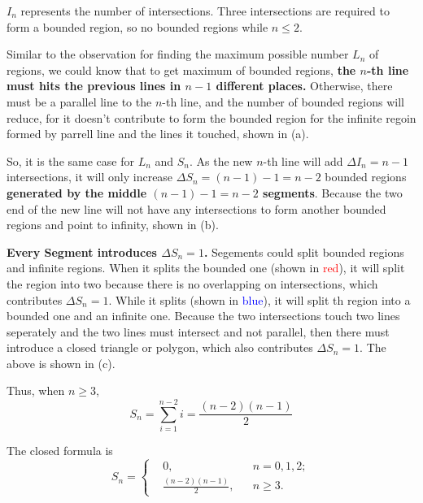 \documentclass[a4paper,12pt]{article}
\makeatletter
\newtheorem*{solution}{Solution}
\theoremstyle{definition}
\renewenvironment{solution}[1][Solution] {\par\pushQED{\qed}\normalfont\topsep6\p@\@plus6\p@\relax\trivlist\item[\hskip\labelsep\bfseries#1\@addpunct{.}]\ignorespaces}{\popQED\endtrivlist\@endpefalse} \makeatother
\newenvironment{problems}{\begin{list}{}{\renewcommand{\makelabel}[1]{\textbf{##1}\hfil}}}{\end{list}}
\makeatother
\begin{document}
\begin{problems}
\begin{solution}
        $I_n$ represents the number of intersections. Three intersections are required to form a bounded region, so no bounded regions while $n\leq 2$. 

        Similar to the observation for finding the maximum possible number $L_n$ of regions, we could know that to get maximum of bounded regions, \textbf{the $n$-th line must hits the previous lines in $n-1$ different places.} Otherwise, there must be a parallel line to the $n$-th line, and the number of bounded regions will reduce, for it doesn't contribute to form the bounded region for the infinite regoin formed by parrell line and the lines it touched, shown in (a).

        \begin{figure}[h]
            \centering
            \subfigure[Intersections.]{}
        \end{figure}
        
        So, it is the same case for $L_n$ and $S_n$. As the new $n$-th line will add $\Delta I_n=n-1$ intersections, it will only increase $\Delta S_n=(n-1)-1=n-2$ bounded regions \textbf{generated by the middle $(n-1)-1=n-2$ segments}. Because the two end of the new line will not have any intersections to form another bounded regions and point to infinity, shown in (b).

        \textbf{Every Segment introduces $\Delta S_n=1$.} Segements could split bounded regions and infinite regions. When it splits the bounded one (shown in  \textcolor{red}{red}), it will split the region into two because there is no overlapping on intersections, which contributes $\Delta S_n=1$. While it splits (shown in \textcolor{blue}{blue}), it will split th region into a bounded one and an infinite one. Because the two intersections touch two lines seperately and the two lines must intersect and not parallel, then there must introduce a closed triangle or polygon, which also contributes $\Delta S_n=1$. The above is shown in (c).

        Thus, when $n\geq 3$,
        \begin{equation*}
            S_n=\sum_{i=1}^{n-2} i = \frac{(n-2)(n-1)}{2}
        \end{equation*}

        The closed formula is
        \begin{equation*}
            S_n=\left\{
            \begin{aligned}
                &0,&&n=0,1,2;\\
                &\frac{(n-2)(n-1)}{2},&&n\geq 3.
            \end{aligned}
            \right.
        \end{equation*}


\end{solution}
\end{problems}
\end{document}
